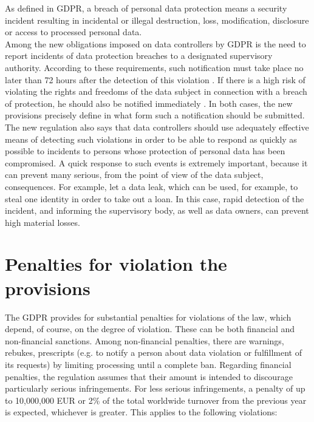 \documentclass[en, noamssymb]{mgr}
\begin{document}
As defined in GDPR, a breach of personal data protection means a security incident resulting in incidental or illegal destruction, loss, modification, disclosure or access to processed personal data.\\
\indent Among the new obligations imposed on data controllers by GDPR is the need to report incidents of data protection breaches to a designated supervisory authority. According to these requirements, such notification must take place no later than 72 hours after the detection of this violation \cite{rodo_art33}. If there is a high risk of violating the rights and freedoms of the data subject in connection with a breach of protection, he should also be notified immediately \cite{rodo_art34}. In both cases, the new provisions precisely define in what form such a notification should be submitted.\\
\indent The new regulation also says that data controllers should use adequately effective means of detecting such violations in order to be able to respond as quickly as possible to incidents to persons whose protection of personal data has been compromised. A quick response to such events is extremely important, because it can prevent many serious, from the point of view of the data subject, consequences. For example, let a data leak, which can be used, for example, to steal one identity in order to take out a loan. In this case, rapid detection of the incident, and informing the supervisory body, as well as data owners, can prevent high material losses.

\section{Penalties for violation the provisions}

The GDPR provides for substantial penalties for violations of the law, which depend, of course, on the degree of violation. These can be both financial and non-financial sanctions. Among non-financial penalties, there are warnings, rebukes, prescripts (e.g. to notify a person about data violation or fulfillment of its requests) by limiting processing until a complete ban. Regarding financial penalties, the regulation assumes that their amount is intended to discourage particularly serious infringements. For less serious infringements, a penalty of up to 10,000,000 EUR or 2\% of the total worldwide turnover from the previous year is expected, whichever is greater. This applies to the following violations:
\end{document}

